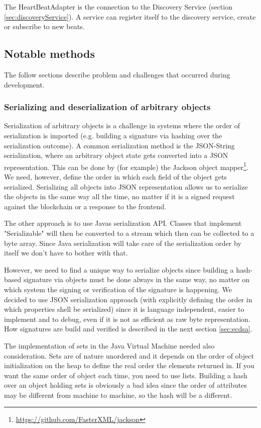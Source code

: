 The HeartBeatAdapter is the connection to the Discovery Service (section \ref{sec:discoveryService}). A service can register itself to the discovery service, create or subscribe to new beats.

\subsection{Notable methods}
The follow sections describe problem and challenges that occurred during development.

\subsubsection{Serializing and deserialization of arbitrary objects}
\label{sec:serialobject}

Serialization of arbitrary objects is a challenge in systems where the order of serialization is imported (e.g. building a signature via hashing over the serialization outcome). A common serialization method is the JSON-String serialization, where an arbitrary object state gets converted into a JSON representation. This can be done by (for example) the Jackson object mapper\footnote{\url{https://github.com/FasterXML/jackson}}. We need, however, define the order  in which each field of the object gets serialized. Serializing all objects into JSON representation allows us to serialize the objects in the same way all the time, no matter if it is a signed request against the blockchain or a response to the frontend. 

The other approach is to use Javas serialization API. Classes that implement "Serializable" will then be converted to a stream which then can be collected to a byte array. Since Java serialization will take care of the serialization order by itself we don’t have to bother with that. 

However, we need to find a unique way to serialize objects since building a hash-based signature via objects must be done always in the same way, no matter on which system the signing or verification of the signature is happening. We decided to use JSON serialization approach (with explicitly defining the order in which properties shell be serialized) since it is language independent, easier to implement and to debug, even if it is not as efficient as raw byte representation. How signatures are build and verified is described in the next section \ref{sec:ecdsa}. 

The implementation of sets in the Java Virtual Machine needed also consideration. Sets are of nature unordered and it depends on the order of object initialization on the heap to define the real order the elements returned in. If you want the same order of object each time, you need to use lists. Building a hash over an object holding sets is obviously a bad idea since the order of attributes may be different from machine to machine, so the hash will be a different.  


